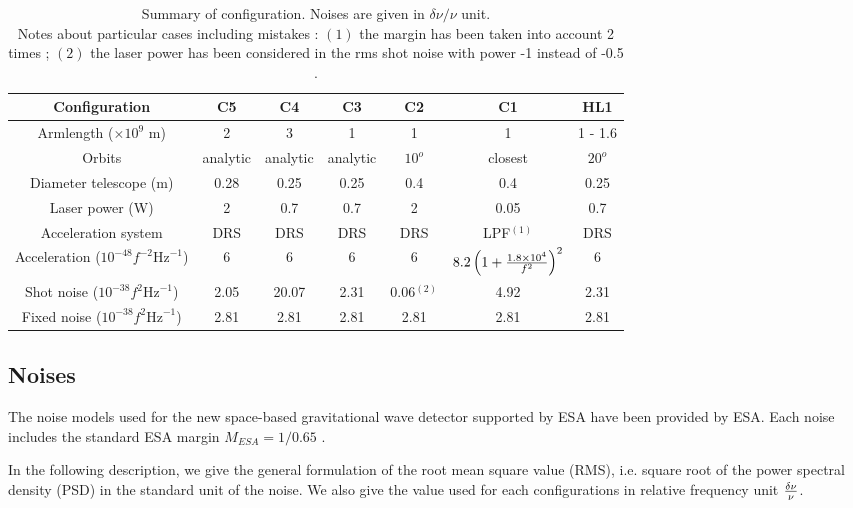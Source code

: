 \documentclass{iopart}
\begin{document}
\begin{table}[H]
\begin{center}
\begin{tabular}{|c|c|c|c|c|c|c|}
\hline
Configuration 				& C5 	& C4	 	& C3 	& C2 	& C1  	& HL1 	\\
\hline
Armlength ($\times 10^9 $ m) 	& 2 		& 3 		& 1		& 1		& 1 	  	&  1 - 1.6 		\\
Orbits					& analytic & analytic & analytic & $10^o$ & closest 	& $20^o$ \\
\hline
Diameter telescope (m) 		& 0.28 	& 0.25 	& 0.25	& 0.4		& 0.4 	&  0.25 	\\
Laser power (W) 			& 2	 	& 0.7 	& 0.7		& 2		& 0.05 	&  0.7 		\\
Acceleration system 			& DRS	& DRS 	& DRS	& DRS	& LPF$^{(1)}$	&  DRS 	\\
\hline
Acceleration ($ 10^{-48} f^{-2} \textrm{Hz}^{-1}$)  & 6	&  6	& 6	& 6	&  $8.2\left( 1 + {  1.8 \times 10^4 \over f^2 }  \right) ^ 2 $	&   6 \\  %
Shot noise ($ 10^{-38} f^{2}  \textrm{Hz}^{-1}$)  &  2.05 &  20.07 &  2.31 & 0.06$^{(2)}$  & 4.92 & 2.31 \\ %
Fixed noise ($10^{-38} f^{2} \textrm{Hz}^{-1}$)  &  2.81 &  2.81 &  2.81 & 2.81  & 2.81 &  2.81 \\ %
\hline
\end{tabular}
\end{center}
\caption{Summary of configuration. Noises are given in $\delta \nu / \nu$ unit. \\ 
{ \scriptsize Notes about particular cases including mistakes : ${(1)}$ the margin has been taken into account 2 times  ; 
${(2)}$ the laser power has been considered in the rms shot noise  with power -1 instead of -0.5 . } }
\label{T:Configs}
\end{table}%


\subsection{Noises}
\label{SS:Inst:Noises}
The noise models used for the new space-based gravitational wave detector supported by ESA have been provided by ESA.
Each noise includes the standard ESA margin $M_{ESA} = 1 / 0.65 $ .

In the following description, we give the general formulation of the root mean square value (RMS), i.e. square root of the power spectral density (PSD) in the standard unit of the noise. 
We also give the value used for each configurations in relative frequency unit $\delta \nu \over \nu$.
\end{document}
